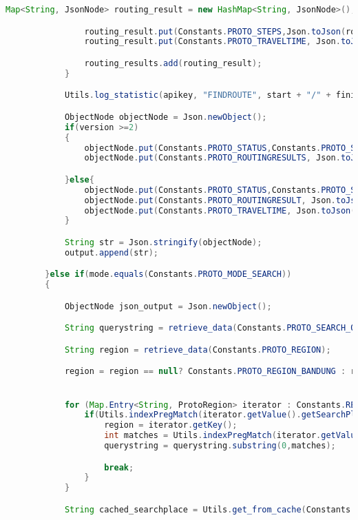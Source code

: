\begin{lstlisting}[language=Java,basicstyle=\tiny,caption=Application.java]
                Map<String, JsonNode> routing_result = new HashMap<String, JsonNode>();

                routing_result.put(Constants.PROTO_STEPS,Json.toJson(route_output));
                routing_result.put(Constants.PROTO_TRAVELTIME, Json.toJson(format_traveltime(travel_time)));

                routing_results.add(routing_result);
            }

            Utils.log_statistic(apikey, "FINDROUTE", start + "/" + finish + "/" + results.size());

            ObjectNode objectNode = Json.newObject();
            if(version >=2)
            {
                objectNode.put(Constants.PROTO_STATUS,Constants.PROTO_STATUS_OK);
                objectNode.put(Constants.PROTO_ROUTINGRESULTS, Json.toJson(routing_results));

            }else{
                objectNode.put(Constants.PROTO_STATUS,Constants.PROTO_STATUS_OK);
                objectNode.put(Constants.PROTO_ROUTINGRESULT, Json.toJson(routing_results.get(0).get(Constants.PROTO_STEPS)));
                objectNode.put(Constants.PROTO_TRAVELTIME, Json.toJson(routing_results.get(0).get(Constants.PROTO_TRAVELTIME)));
            }

            String str = Json.stringify(objectNode);
            output.append(str);

        }else if(mode.equals(Constants.PROTO_MODE_SEARCH))
        {

            ObjectNode json_output = Json.newObject();

            String querystring = retrieve_data(Constants.PROTO_SEARCH_QUERYSTRING);

            String region = retrieve_data(Constants.PROTO_REGION);

            region = region == null? Constants.PROTO_REGION_BANDUNG : region;


            for (Map.Entry<String, ProtoRegion> iterator : Constants.REGIONINFOS.entrySet()) {
                if(Utils.indexPregMatch(iterator.getValue().getSearchPlace_regex(),querystring)!=-1){
                    region = iterator.getKey();
                    int matches = Utils.indexPregMatch(iterator.getValue().getSearchPlace_regex(),querystring);
                    querystring = querystring.substring(0,matches);

                    break;
                }
            }

            String cached_searchplace = Utils.get_from_cache(Constants.CACHE_SEARCHPLACE,region + "/" + querystring);


\end{lstlisting}
